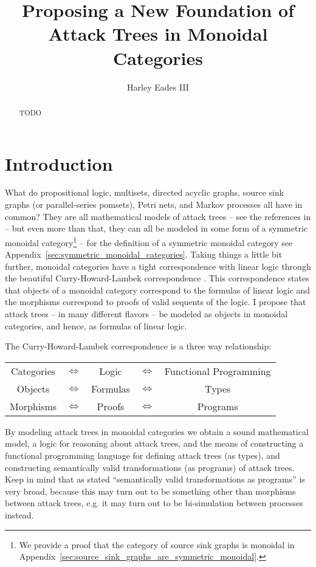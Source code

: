 \documentclass{llncs}
\date{}
\begin{document}
\title{Proposing a New Foundation of Attack Trees in Monoidal Categories}

\author{Harley Eades III}

\maketitle 

\begin{abstract}
  TODO
\end{abstract}

\section{Introduction}
\label{sec:introduction}

What do propositional logic, multisets, directed acyclic graphs,
source sink graphs (or parallel-series pomsets), Petri nets, and
Markov processes all have in common?  They are all mathematical models
of attack trees -- see the references in \cite{Jhawar:2015} -- but
even more than that, they can all be modeled in some form of a
symmetric monoidal category\footnote{We provide a proof that the
  category of source sink graphs is monoidal in
  Appendix~\ref{sec:source_sink_graphs_are_symmetric_monoidal}.}
\cite{Tzouvaras:1998,Brown:1991,Fiore:2013,FrancescoAlbasini2010} --
for the definition of a symmetric monoidal category see
Appendix~\ref{sec:symmetric_monoidal_categories}.  Taking things a
little bit further, monoidal categories have a tight correspondence
with linear logic through the beautiful Curry-Howard-Lambek
correspondence \cite{MSC:4439568}.  This correspondence states that
objects of a monoidal category correspond to the formulas of linear
logic and the morphisms correspond to proofs of valid sequents of the
logic.  I propose that attack trees -- in many different flavors -- be
modeled as objects in monoidal categories, and hence, as formulas of
linear logic.

The Curry-Howard-Lambek correspondence is a three way relationship:
\begin{center}
  \setlength{\tabcolsep}{7pt}
  \begin{tabular}{ccccc}
    Categories & $\iff$ & Logic    & $\iff$   & Functional Programming\\
    Objects    & $\iff$ & Formulas & $\iff$   & Types    \\
    Morphisms  & $\iff$ & Proofs   & $\iff$   & Programs 
  \end{tabular}
\end{center}
By modeling attack trees in monoidal categories we obtain a sound
mathematical model, a logic for reasoning about attack trees, and the
means of constructing a functional programming language for defining
attack trees (as types), and constructing semantically valid
transformations (as programs) of attack trees.  Keep in mind that as
stated ``semantically valid transformations as programs'' is very
broad, because this may turn out to be something other than morphisms
between attack trees, e.g. it may turn out to be bi-simulation between
processes instead.
\end{document}
